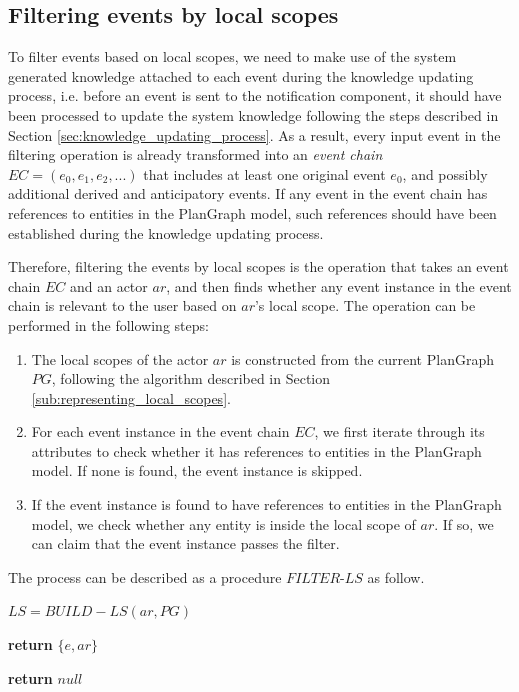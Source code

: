 \subsection{Filtering events by local scopes} %
\label{sub:event_filtering_algorithm}
To filter events based on local scopes, we need to make use of the system generated knowledge attached to each event during the knowledge updating process, i.e. before an event is sent to the notification component, it should have been processed to update the system knowledge following the steps described in Section \ref{sec:knowledge_updating_process}. As a result, every input event in the filtering operation is already transformed into an \emph{event chain} $EC=(e_0, e_1, e_2, ...)$ that includes at least one original event $e_0$, and possibly additional derived and anticipatory events. If any event in the event chain has references to entities in the PlanGraph model, such references should have been established during the knowledge updating process.

Therefore, filtering the events by local scopes is the operation that takes an event chain $EC$ and an actor $ar$, and then finds whether any event instance in the event chain is relevant to the user based on $ar$'s local scope. The operation can be performed in the following steps:

\begin{enumerate}
	\item The local scopes of the actor $ar$ is constructed from the current PlanGraph $PG$, following the algorithm described in Section \ref{sub:representing_local_scopes}.
	\item For each event instance in the event chain $EC$, we first iterate through its attributes to check whether it has references to entities in the PlanGraph model. If none is found, the event instance is skipped.
	\item If the event instance is found to have references to entities in the PlanGraph model, we check whether any entity is inside the local scope of $ar$. If so, we can claim that the event instance passes the filter.
\end{enumerate}

The process can be described as a procedure $FILTER\textrm{-}LS$ as follow.

{\footnotesize
\begin{algorithm}
\begin{algorithmic}[1]
	\State $LS = BUILD-LS(ar, PG)$

   						\State \textbf{return} $\{e, ar\}$ 
   					\EndIf
				\EndFor

   			\EndIf
   		\EndFor
	\EndFor
	\State \textbf{return} $null$ 
\EndProcedure
\end{algorithmic}
\end{algorithm}
}
